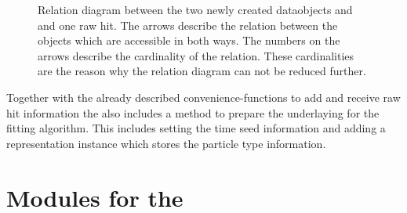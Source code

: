 \begin{figure}
  \centering
  \caption[Relation diagram between \RecoTrack, \Hit and raw hits.]{Relation diagram between the two newly created dataobjects \RecoTrack and \Hit and one raw hit. The arrows describe the relation between the objects which are accessible in both ways. The numbers on the arrows describe the cardinality of the relation. These cardinalities are the reason why the relation diagram can not be reduced further.}
  \label{fig-reco-hit-relation}
\end{figure}

Together with the already described convenience-functions to add and receive raw hit information the \RecoTrack also includes a method to prepare the underlaying \Track for the fitting algorithm. This includes setting the time seed information and adding a representation instance which stores the particle type information.

\section{Modules for the \RecoTrack}

